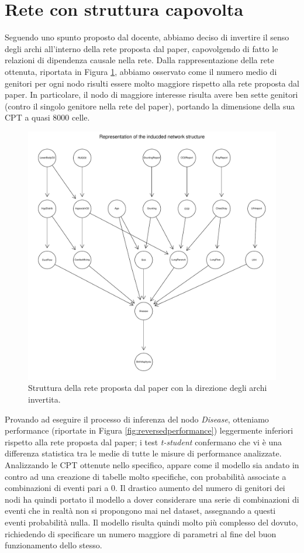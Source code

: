 \section{Rete con struttura capovolta}
Seguendo uno spunto proposto dal docente, abbiamo deciso di invertire il senso degli archi all'interno della rete proposta dal paper, capovolgendo di fatto le relazioni di dipendenza causale nella rete. Dalla rappresentazione della rete ottenuta, riportata in Figura \ref{fig:reversedstructure}, abbiamo osservato come il numero medio di genitori per ogni nodo risulti essere molto maggiore rispetto alla rete proposta dal paper. In particolare, il nodo di maggiore interesse risulta avere ben sette genitori (contro il singolo genitore nella rete del paper), portando la dimensione della sua CPT a quasi $8000$ celle. 
\begin{figure}
	\centering
	\includegraphics[width=1\linewidth]{images/reversed_structure}
	\caption{Struttura della rete proposta dal paper con la direzione degli archi invertita.}
	\label{fig:reversedstructure}
\end{figure}
Provando ad eseguire il processo di inferenza del nodo \textit{Disease}, otteniamo performance (riportate in Figura \ref{fig:reversedperformance}) leggermente inferiori rispetto alla rete proposta dal paper; i test \textit{t-student} confermano che vi è una differenza statistica tra le medie di tutte le misure di performance analizzate. Analizzando le CPT ottenute nello specifico, appare come il modello sia andato in contro ad una creazione di tabelle molto specifiche, con probabilità associate a combinazioni di eventi pari a $0$. Il drastico aumento del numero di genitori dei nodi ha quindi portato il modello a dover considerare una serie di combinazioni di eventi che in realtà non si propongono mai nel dataset, assegnando a questi eventi probabilità nulla. Il modello risulta quindi molto più complesso del dovuto, richiedendo di specificare un numero maggiore di parametri al fine del buon funzionamento dello stesso.
